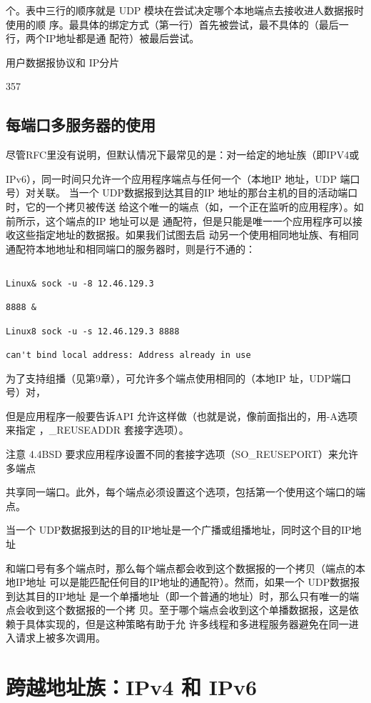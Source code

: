 个。表中三行的顺序就是 UDP 模块在尝试决定哪个本地端点去接收进人数据报时使用的顺
序。最具体的绑定方式（第一行）首先被尝试，最不具体的（最后一行，两个IP地址都是通
配符）被最后尝试。

用户数据报协议和 IP分片

357

\subsection{每端口多服务器的使用}
尽管RFC里没有说明，但默认情况下最常见的是：对一给定的地址族（即IPV4或

IPv6），同一时间只允许一个应用程序端点与任何一个（本地IP 地址，UDP 端口号）对关联。
当一个 UDP数据报到达其目的IP 地址的那台主机的目的活动端口时，它的一个拷贝被传送
给这个唯一的端点（如，一个正在监听的应用程序）。如前所示，这个端点的IP 地址可以是
通配符，但是只能是唯一一个应用程序可以接收这些指定地址的数据报。如果我们试图去启
动另一个使用相同地址族、有相同通配符本地地址和相同端口的服务器时，则是行不通的：

\begin{verbatim}
    
Linux& sock -u -8 12.46.129.3

8888 &

Linux8 sock -u -s 12.46.129.3 8888

can't bind local address: Address already in use
\end{verbatim}

为了支持组播（见第9章），可允许多个端点使用相同的（本地IP 址，UDP端口号）对，

但是应用程序一般要告诉API 允许这样做（也就是说，像前面指出的，用-A选项来指定
，\_REUSEADDR 套接字选项）。

注意 4.4BSD 要求应用程序设置不同的套接字选项（SO\_REUSEPORT）来允许多端点

共享同一端口。此外，每个端点必须设置这个选项，包括第一个使用这个端口的端点。

当一个 UDP数据报到达的目的IP地址是一个广播或组播地址，同时这个目的IP地址

和端口号有多个端点时，那么每个端点都会收到这个数据报的一个拷贝（端点的本地IP地址
可以是能匹配任何目的IP地址的通配符）。然而，如果一个 UDP数据报到达其目的IP地址
是一个单播地址（即一个普通的地址）时，那么只有唯一的端点会收到这个数据报的一个拷
贝。至于哪个端点会收到这个单播数据报，这是依赖于具体实现的，但是这种策略有助于允
许多线程和多进程服务器避免在同一进入请求上被多次调用。

\section{跨越地址族：IPv4 和 IPv6}


